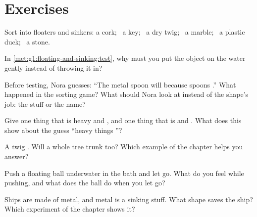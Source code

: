 \section{Exercises}

\begin{exercise}[$\star$]\label{exo:g1:floating-and-sinking:1}
Sort into floaters and sinkers: a cork; \ a key; \ a dry twig; \ a
marble; \ a plastic duck; \ a stone.
\end{exercise}

\begin{exercise}[$\star$]\label{exo:g1:floating-and-sinking:2}
In \cref{met:g1:floating-and-sinking:test}, why must you put the
object on the water gently instead of throwing it in?
\end{exercise}

\begin{exercise}[$\star$]\label{exo:g1:floating-and-sinking:3}
Before testing, Nora guesses: ``The metal spoon will  because
spoons .'' What happened in the sorting game? What should Nora
look at instead of the shape's job: the stuff or the name?
\end{exercise}

\begin{exercise}[$\star$]\label{exo:g1:floating-and-sinking:4}
Give one thing that is heavy and , and one thing that is 
and . What does this show about the guess ``heavy things
''?
\end{exercise}

\begin{exercise}[$\star$]\label{exo:g1:floating-and-sinking:5}
A twig . Will a whole tree trunk  too? Which example of
the chapter helps you answer?
\end{exercise}

\begin{exercise}[$\star$]\label{exo:g1:floating-and-sinking:6}
Push a floating ball underwater in the bath and let go. What do you
feel while pushing, and what does the ball do when you let go?
\end{exercise}

\begin{exercise}[$\star$]\label{exo:g1:floating-and-sinking:7}
Ships are made of metal, and metal is a sinking stuff. What shape
saves the ship? Which experiment of the chapter shows it?
\end{exercise}

